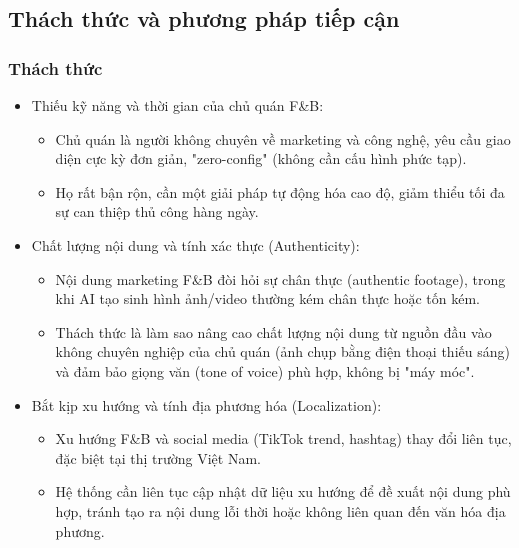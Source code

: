 \subsection{Thách thức và phương pháp tiếp
cận}\label{thuxe1ch-thux1ee9c-vuxe0-phux1b0ux1a1ng-phuxe1p-tiux1ebfp-cux1eadn}

\subsubsection{Thách thức}\label{thuxe1ch-thux1ee9c}

\begin{itemize}
\item
  Thiếu kỹ năng và thời gian của chủ quán F\&B:

  \begin{itemize}
  \item
    Chủ quán là người không chuyên về marketing và công nghệ, yêu cầu
    giao diện cực kỳ đơn giản, "zero-config" (không cần cấu hình phức
    tạp).
  \item
    Họ rất bận rộn, cần một giải pháp tự động hóa cao độ, giảm thiểu tối
    đa sự can thiệp thủ công hàng ngày.
  \end{itemize}
\item
  Chất lượng nội dung và tính xác thực (Authenticity):

  \begin{itemize}
  \item
    Nội dung marketing F\&B đòi hỏi sự chân thực (authentic footage),
    trong khi AI tạo sinh hình ảnh/video thường kém chân thực hoặc tốn
    kém.
  \item
    Thách thức là làm sao nâng cao chất lượng nội dung từ nguồn đầu vào
    không chuyên nghiệp của chủ quán (ảnh chụp bằng điện thoại thiếu
    sáng) và đảm bảo giọng văn (tone of voice) phù hợp, không bị "máy
    móc".
  \end{itemize}
\item
  Bắt kịp xu hướng và tính địa phương hóa (Localization):

  \begin{itemize}
  \item
    Xu hướng F\&B và social media (TikTok trend, hashtag) thay đổi liên
    tục, đặc biệt tại thị trường Việt Nam.
  \item
    Hệ thống cần liên tục cập nhật dữ liệu xu hướng để đề xuất nội dung
    phù hợp, tránh tạo ra nội dung lỗi thời hoặc không liên quan đến văn
    hóa địa phương.
  \end{itemize}
\end{itemize}

